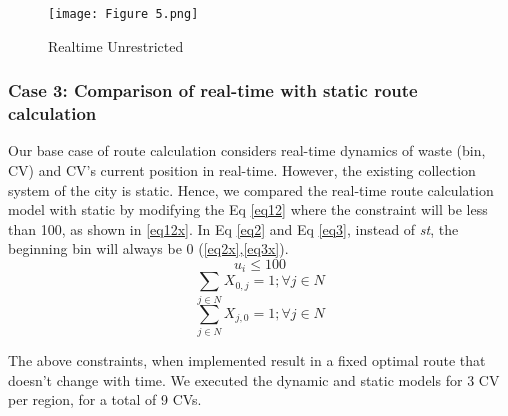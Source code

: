 \documentclass[12pt]{article}
\begin{document}

 

\begin{figure}[H]
    \centering
    \texttt{[image: Figure 5.png]} %
    \caption{Realtime Unrestricted}\label{fig2}
\end{figure}


\subsubsection*{Case 3: Comparison of real-time with static route calculation}

Our base case of route calculation considers real-time dynamics of waste (bin, CV) and CV's current position in real-time. However, the existing collection system of the city is static. Hence, we compared the real-time route calculation model with static by modifying the Eq \eqref{eq12} where the constraint will be less than 100, as shown in \eqref{eq12x}. In Eq \eqref{eq2} and Eq \eqref{eq3}, instead of \textit{st}, the beginning bin will always be 0
 (\ref{eq2x},\ref{eq3x}). 
\begin{equation}\label{eq12x}
    u_i\le 100
\end{equation}
\begin{equation}\label{eq2x}
    \sum_{j\in N}X_{0,j}=1 ; \forall j \in N
\end{equation}
\begin{equation}\label{eq3x}
    \sum_{j\in N}X_{j,0}=1 ; \forall j \in N
\end{equation}

The above constraints, when implemented result in a fixed optimal route that doesn't change with time. We executed the dynamic and static models for 3 CV per region, for a total of 9 CVs.
\end{document}
